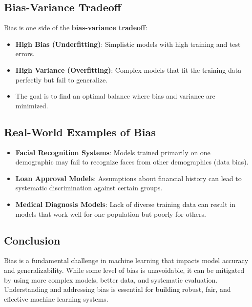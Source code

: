 \subsection*{Bias-Variance Tradeoff}
Bias is one side of the \textbf{bias-variance tradeoff}:
\begin{itemize}
    \item \textbf{High Bias (Underfitting)}: Simplistic models with high training and test errors.
    \item \textbf{High Variance (Overfitting)}: Complex models that fit the training data perfectly but fail to generalize.
    \item The goal is to find an optimal balance where bias and variance are minimized.
\end{itemize}

\subsection*{Real-World Examples of Bias}
\begin{itemize}
    \item \textbf{Facial Recognition Systems}: Models trained primarily on one demographic may fail to recognize faces from other demographics (data bias).
    \item \textbf{Loan Approval Models}: Assumptions about financial history can lead to systematic discrimination against certain groups.
    \item \textbf{Medical Diagnosis Models}: Lack of diverse training data can result in models that work well for one population but poorly for others.
\end{itemize}

\subsection*{Conclusion}
Bias is a fundamental challenge in machine learning that impacts model accuracy and generalizability. While some level of bias is unavoidable, it can be mitigated by using more complex models, better data, and systematic evaluation. Understanding and addressing bias is essential for building robust, fair, and effective machine learning systems.
